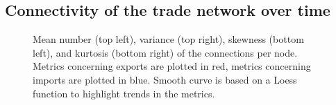 \documentclass[
  authoryear,
  review,
  3p]{elsarticle}
\begin{document}
\subsection{Connectivity of the trade network over
time}\label{connectivity-of-the-trade-network-over-time}

\begin{figure}[t]


\caption{\label{fig-network-connectivity}Mean number (top left),
variance (top right), skewness (bottom left), and kurtosis (bottom
right) of the connections per node. Metrics concerning exports are
plotted in red, metrics concerning imports are plotted in blue. Smooth
curve is based on a Loess function to highlight trends in the metrics.}

\end{figure}%
\end{document}
